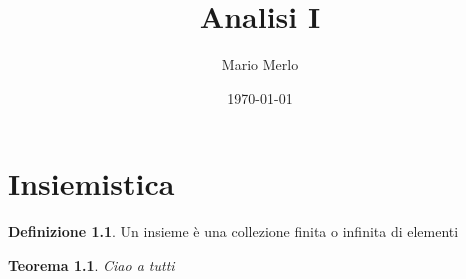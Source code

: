 \documentclass[a4paper, 12pt]{book}
\title{Analisi I}
\author{Mario Merlo}
\date{\today}
\theoremstyle{definition}
\newtheorem{definition}[chapter]{Definizione}
\theoremstyle{remark}
\theoremstyle{plain}
\newtheorem{theorem}{Teorema}[chapter]
\begin{document}
\maketitle

\doclicenseThis

\chapter{Insiemistica}

\begin{definition}
    Un insieme è una collezione finita o infinita di elementi
\end{definition}

\begin{theorem}
    Ciao a tutti
\end{theorem}
\end{document}
